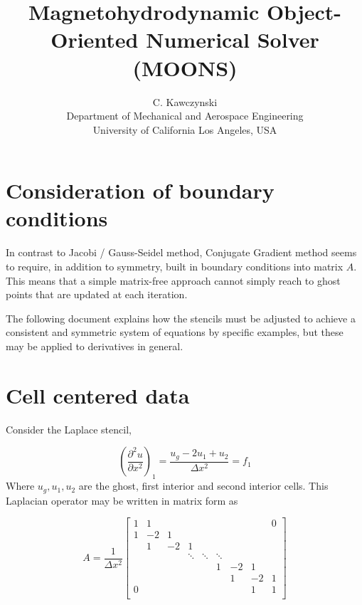 \documentclass[landscape]{article}
\begin{document}
\doublespacing
\title{Magnetohydrodynamic Object-Oriented Numerical Solver (MOONS)}
\author{C. Kawczynski \\
Department of Mechanical and Aerospace Engineering \\
University of California Los Angeles, USA\\
}

\section{Consideration of boundary conditions}
In contrast to Jacobi / Gauss-Seidel method, Conjugate Gradient method seems to require, in addition to symmetry, built in boundary conditions into matrix $A$. This means that a simple matrix-free approach cannot simply reach to ghost points that are updated at each iteration.

The following document explains how the stencils must be adjusted to achieve a consistent and symmetric system of equations by specific examples, but these may be applied to derivatives in general.

\newpage
\section{Cell centered data}
Consider the Laplace stencil,

\begin{equation}
   \left(\frac{\partial^2 u}{\partial x^2}\right)_{1} = 
   \frac{u_g - 2 u_1 + u_{2}}{\Delta x^2} = f_1
\end{equation}
Where $u_g,u_1,u_2$ are the ghost, first interior and second interior cells. This Laplacian operator may be written in matrix form as

\[ A = \frac{1}{\Delta x^2} \left[\begin{array}{ccccccccc}
1  & 1     &           &           &           &           &           &         &  0 \\
1  & -2    & 1         &           &           &           &           &         &    \\
   & 1     & -2        & 1         &           &           &           &         &    \\
   &       &           & \ddots    & \ddots    & \ddots    &           &         &    \\
   &       &           &           &           & 1         & -2        & 1       &    \\
   &       &           &           &           &           &  1        & -2      &  1 \\
0  &       &           &           &           &           &           & 1       &  1 \\
\end{array} \right]
\]
\end{document}
